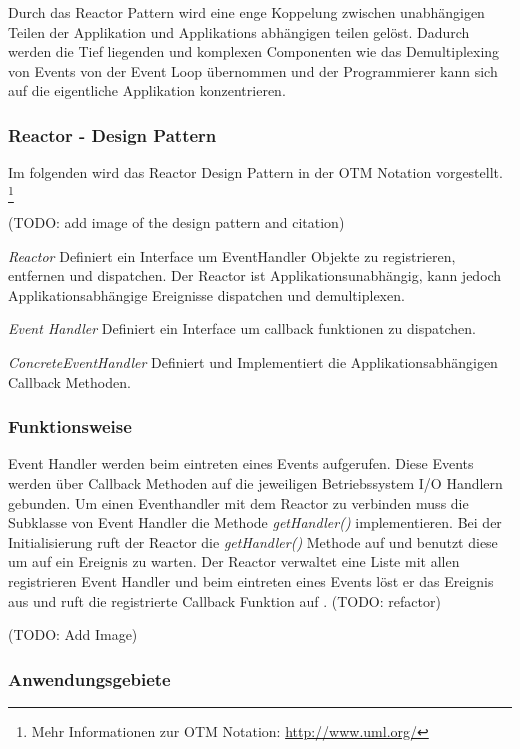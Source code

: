 Durch das Reactor Pattern wird eine enge Koppelung zwischen unabhängigen Teilen der Applikation und Applikations abhängigen teilen gelöst. Dadurch werden die Tief liegenden und komplexen Componenten wie das Demultiplexing von Events von der Event Loop übernommen und der Programmierer kann sich auf die eigentliche Applikation konzentrieren. \cite[p. 2]{Sch95}


\subsubsection{Reactor - Design Pattern}

Im folgenden wird das Reactor Design Pattern in der OTM Notation vorgestellt. \footnote[0]{Mehr Informationen zur OTM Notation: \url{http://www.uml.org/}}

(TODO: add image of the design pattern and citation)

\cite[p. 2]{Sch95}

\emph{Reactor}
	Definiert ein Interface um EventHandler Objekte zu registrieren, entfernen und dispatchen. Der Reactor ist Applikationsunabhängig, kann jedoch Applikationsabhängige Ereignisse dispatchen und demultiplexen. 

\emph{Event Handler}
	Definiert ein Interface um callback funktionen zu dispatchen. 

\emph{ConcreteEventHandler}
	Definiert und Implementiert die Applikationsabhängigen Callback Methoden. 


\subsubsection{Funktionsweise}
Event Handler werden beim eintreten eines Events aufgerufen. Diese Events werden über Callback Methoden auf die jeweiligen Betriebssystem I/O Handlern gebunden. Um einen Eventhandler mit dem Reactor zu verbinden muss die Subklasse von Event Handler die Methode \emph{getHandler()} implementieren. Bei der Initialisierung ruft der Reactor die \emph{getHandler()} Methode auf und benutzt diese um auf ein Ereignis zu warten. Der Reactor verwaltet eine Liste mit allen registrieren Event Handler und beim eintreten eines Events löst er das Ereignis aus und ruft die registrierte Callback Funktion auf \cite[p. 5]{Sch95}. (TODO: refactor)


(TODO: Add Image)


\subsubsection{Anwendungsgebiete}

